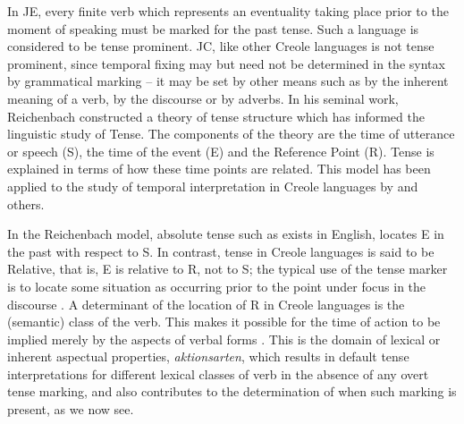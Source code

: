 \documentclass[output=paper,colorlinks,citecolor=brown]{langscibook}
\begin{document}
In JE, every finite verb which represents an eventuality taking place prior to the moment of speaking must be marked for the past tense. Such a language is considered to be tense prominent. JC, like other Creole languages is not tense prominent, since temporal fixing may but need not be determined in the syntax by grammatical marking -- it may be set by other means such as by the inherent meaning of a verb, by the discourse or by adverbs. In his seminal \citeyear{Reichenbach1947} work, Reichenbach constructed a theory of tense structure which has informed the linguistic study of Tense. The components of the theory are the time of utterance or speech (S), the time of the event (E) and the Reference Point (R). Tense is explained in terms of how these time points are related. This model has been applied to the study of temporal interpretation in Creole languages by \citet{Winford2001comparison, Lefèbvre1996,muysken1981} and others.

In the Reichenbach model, absolute tense such as exists in English, locates E in the past with respect to S. In contrast, tense in Creole languages is said to be Relative, that is, E is relative to R, not to S; the typical use of the tense marker is to locate some situation as occurring prior to the point under focus in the discourse \citep[162]{Winford2001comparison}. A determinant of the location of R in Creole languages is the (semantic) class of the verb. This makes it possible for the time of action to be implied merely by the aspects of verbal forms \citep[123]{Bhat1999}. This is the domain of lexical or inherent aspectual properties, \textit{aktionsarten}, which results in default tense interpretations for different lexical classes of verb in the absence of any overt tense marking, and also contributes to the determination of when such marking is present, as we now see.
\end{document}
